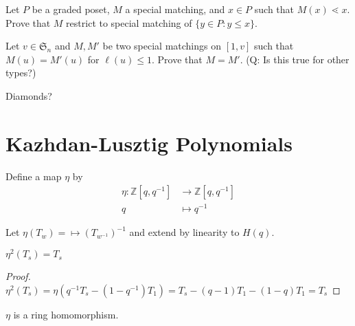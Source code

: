 \begin{exercise}
	Let $P$ be a graded poset, $M$ a special matching, and $x\in P$ such that $M(x)\lessdot x$. Prove that $M$ restrict to special matching of $\{y\in P: y\leq x\}$.
\end{exercise}

\begin{exercise}
	Let $v\in \mathfrak{S}_n$ and $M,M'$ be two special matchings on $[1,v]$ such that $M(u)=M'(u)$ for $\ell(u)\leq 1$. Prove that $M=M'$. (Q: Is this true for other types?)
\end{exercise}

\begin{theorem}
	Diamonds?
\end{theorem}

\section{Kazhdan-Lusztig Polynomials}
\begin{definition}
	Define a map $\eta$ by
	\begin{align*}
	\eta:\mathbb{Z}[q,q^{-1}]&\to\mathbb{Z}[q,q^{-1}]\\
	q&\mapsto q^{-1}
	\end{align*}

Let $\eta(T_w)=\mapsto (T_{w^{-1}})^{-1}$ and extend by linearity to $H(q)$.
\end{definition}
\begin{prop}
	$\eta^2(T_s)=T_s$
\end{prop}
\begin{proof}$\eta^2(T_s)=\eta(q^{-1}T_s-(1-q^{-1})T_1)=T_s-(q-1)T_1-(1-q)T_1=T_s
$
\end{proof}
\begin{theorem}
	$\eta$ is a ring homomorphism.
\end{theorem}
